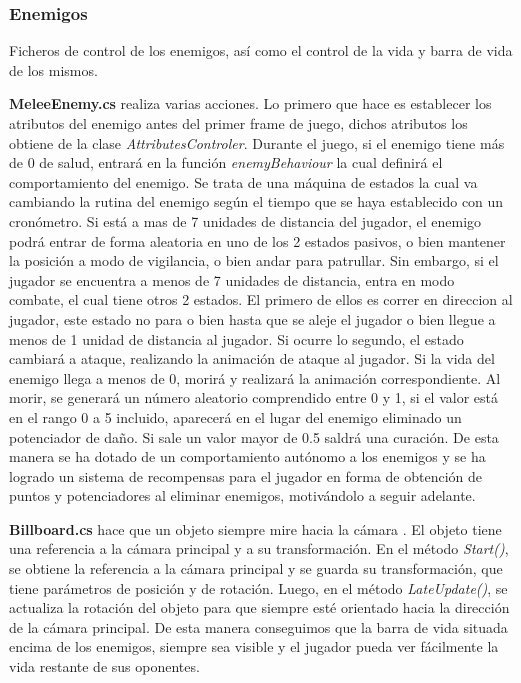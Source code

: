 \subsubsection{Enemigos}

Ficheros de control de los enemigos, así como el control de la vida y barra de vida de los mismos.

\textbf{MeleeEnemy.cs} realiza varias acciones. Lo primero que hace es establecer los atributos del enemigo antes del primer frame de juego, dichos atributos los obtiene de la clase \textit{AttributesControler}. Durante el juego, si el enemigo tiene más de 0 de salud, entrará en la función \textit{enemyBehaviour} la cual definirá el comportamiento del enemigo. Se trata de una máquina de estados la cual va cambiando la rutina del enemigo según el tiempo que se haya establecido con un cronómetro. Si está a mas de 7 unidades de distancia del jugador, el enemigo podrá entrar de forma aleatoria en uno de los 2 estados pasivos, o bien mantener la posición a modo de vigilancia, o bien andar para patrullar. Sin embargo, si el jugador se encuentra a menos de 7 unidades de distancia, entra en modo combate, el cual tiene otros 2 estados. El primero de ellos es correr en direccion al jugador, este estado no para o bien hasta que se aleje el jugador o bien llegue a menos de 1 unidad de distancia al jugador. Si ocurre lo segundo, el estado cambiará a ataque, realizando la animación de ataque al jugador. Si la vida del enemigo llega a menos de 0, morirá y realizará la animación correspondiente. Al morir, se generará un número aleatorio comprendido entre 0 y 1, si el valor está en el rango 0 a 5 incluido, aparecerá en el lugar del enemigo eliminado un potenciador  de daño. Si sale un valor mayor de 0.5 saldrá una curación. De esta manera se ha dotado de un comportamiento autónomo a los enemigos y se ha logrado un sistema de recompensas para el jugador en forma de obtención de puntos y potenciadores al eliminar enemigos, motivándolo a seguir adelante.

\textbf{Billboard.cs} hace que un objeto siempre mire hacia la cámara . El objeto tiene una referencia a la cámara principal y a su transformación. En el método \textit{Start()}, se obtiene la referencia a la cámara principal y se guarda su transformación, que tiene parámetros de posición y de rotación. Luego, en el método \textit{LateUpdate()}, se actualiza la rotación del objeto para que siempre esté orientado hacia la dirección de la cámara principal. De esta manera conseguimos que la barra de vida situada encima de los enemigos, siempre sea visible y el jugador pueda ver fácilmente la vida restante de sus oponentes.

